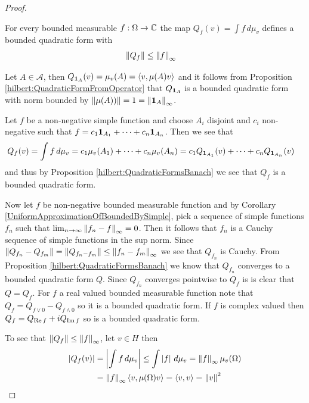 \begin{proof}

\begin{clm}For every bounded measurable $f : \Omega \to \mathbb{C}$ the map $Q_f(v) = \int f \, d\mu_v$ defines a bounded quadratic form with 
\begin{align*}
\left \lVert Q_f \right \rVert &\leq \left \lVert f \right \rVert_\infty
\end{align*}
\end{clm}
Let $A \in \mathcal{A}$, then $Q_{\textbf{1}_{A}}(v) = \mu_v(A) = \langle v ,
\mu(A) v \rangle$ and it follows from Proposition
\ref{hilbert:QuadraticFormFromOperator} that $Q_{\textbf{1}_{A}}$
is a bounded quadratic form with norm bounded by $\left \lVert \mu(A)) \right \rVert = 1 = \left \lVert \textbf{1}_{A} \right \rVert_\infty$.

Let $f$ be a non-negative simple function and choose $A_i$ disjoint
and $c_i$ non-negative such that $f = c_1
\textbf{1}_{A_1} + \dotsb + c_n \textbf{1}_{A_n}$.  Then we see that 
\begin{align*}
Q_f(v) &= \int f \, d\mu_v = c_1 \mu_v(A_1) +  \dotsb + c_n \mu_v(A_n)
                            = c_1 Q_{\textbf{1}_{A_1}}(v) + \dotsb
                            + c_n Q_{\textbf{1}_{A_n}}(v)
\end{align*}
and thus by Proposition
\ref{hilbert:QuadraticFormsBanach} we see that $Q_f$ is a
bounded quadratic form. 

Now let $f$ be non-negative bounded measurable function and by
Corollary \ref{UniformApproximationOfBoundedBySimple}, pick a sequence
of simple functions $f_n$ such that $\lim_{n \to \infty} \left \lVert f_n -
  f \right \rVert_\infty = 0$.   Then it follows that $f_n$ is a Cauchy sequence of
simple functions in the sup norm.  Since $\left \lVert Q_{f_n} -
  Q_{f_m} \right \rVert = \left \lVert Q_{f_n -  f_m} \right \rVert \leq \left \lVert f_n - f_m \right \rVert_\infty$ we see
that $Q_{f_n}$ is Cauchy.   From Proposition
\ref{hilbert:QuadraticFormsBanach} we know that $Q_{f_n}$ converges
to a bounded quadratic form $Q$.   Since $Q_{f_n}$ converges pointwise
to $Q_f$ is is clear that $Q=Q_f$.   For $f$ a real valued bounded
measurable function note that $Q_f = Q_{f \vee 0} - Q_{f \wedge 0}$ so
it is a bounded quadratic form.   If $f$ is complex valued then $Q_f =
Q_{\operatorname*{Re}{f}} + i Q_{\operatorname*{Im}{f}}$ so is a bounded quadratic form.   

To see that $\left \lVert Q_f \right \rVert \leq \left \lVert f \right \rVert_\infty$, let $v \in H$ then
\begin{align*}
  \left \vert Q_f(v) \right \vert &= \left \vert \int f \, d\mu_v \right \vert \leq \int \left \vert  f \right \vert \, d\mu_v =
                 \left \lVert f \right \rVert_\infty \mu_v(\Omega) \\
  &= \left \lVert f \right \rVert_\infty  \langle v, \mu(\Omega) v \rangle = \langle v, v \rangle = \left \lVert v \right \rVert^2
\end{align*}


\end{proof}
